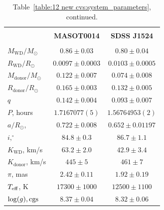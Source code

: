 \begin{landscape}
    \begin{table}
        \centering
        \caption{Table~\ref{table:12 new cvs:system_parameters}, continued.}
        \label{table:12 new cvs:system_parameters cont 2}
        \begin{tabular}{lcc}
            \hline \\
            ~                          & \textbf{MASOT0014}     & \textbf{SDSS J1524} \\
            \hline \hline \\
            $M_\mathrm{WD}/M_\odot$    & $0.86\pm0.03$          & $0.80\pm0.04$ \\
            $R_\mathrm{WD}/R_\odot$    & $0.0097\pm0.0003$      & $0.0103\pm0.0005$ \\
            $M_\mathrm{donor}/M_\odot$ & $0.122\pm0.007$        & $0.074\pm0.008$ \\
            $R_\mathrm{donor}/R_\odot$ & $0.165\pm0.003$        & $0.132\pm0.005$ \\
            $q$                        & $0.142\pm0.004$        & $0.093\pm0.007$ \\
            \hline
            $P$, hours                 & $1.7167077(5)$         & $1.56764953(2)$ \\
            $a/R_\odot$,               & $0.722\pm0.008$        & $0.652\pm0.01197$ \\
            $i, ^\circ$                & $84.8\pm0.3$           & $86.7\pm1.1$ \\
            $K_\mathrm{WD}$, km/s      & $63.2\pm2.0$           & $42.9\pm3.4$ \\
            $K_\mathrm{donor}$, km/s   & $445\pm5$              & $461\pm7$ \\
            \hline
            $\pi$, mas                 & $2.42\pm0.11$          & $1.92\pm0.19$ \\
            $T_{\rm eff}$, K           & $17300\pm1000$         & $12500\pm1100$ \\
            $\log(g), {\rm cgs}$       & $8.37\pm0.04$          & $8.32\pm0.06$ \\
            \hline
            \hline
        \end{tabular}
    \end{table}



\end{landscape}
